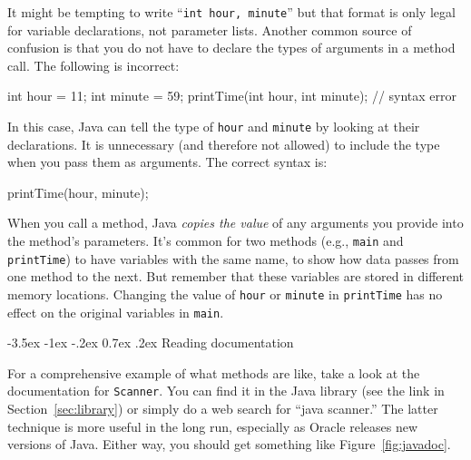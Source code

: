 \documentclass[12pt]{book}
\makeatletter
\renewcommand{\section}{\@startsection {section}{1}{\z@}%
    {-3.5ex \@plus -1ex \@minus -.2ex}%
    {0.7ex \@plus.2ex}%
    {\normalfont\Large\bfseries}}
\theoremstyle{exercise}
\newcommand{\java}[1]{\lstinline{#1}} %
\makeatother
\begin{document}
It might be tempting to write ``\java{int hour, minute}'' but that format is only legal for variable declarations, not parameter lists.
Another common source of confusion is that you do not have to declare the types of arguments in a method call.
The following is incorrect:

\begin{code}
    int hour = 11;
    int minute = 59;
    printTime(int hour, int minute);  // syntax error
\end{code}

In this case, Java can tell the type of \java{hour} and \java{minute} by looking at their declarations.
It is unnecessary (and therefore not allowed) to include the type when you pass them as arguments.
The correct syntax is:

\begin{code}
    printTime(hour, minute);
\end{code}

When you call a method, Java {\it copies the value} of any arguments you provide into the method's parameters.
It's common for two methods (e.g., \java{main} and \java{printTime}) to have variables with the same name, to show how data passes from one method to the next.
But remember that these variables are stored in different memory locations.
Changing the value of \java{hour} or \java{minute} in \java{printTime} has no effect on the original variables in \java{main}.


\section{Reading documentation}
\label{sec:apidocs}


For a comprehensive example of what methods are like, take a look at the documentation for \java{Scanner}.
You can find it in the Java library (see the link in Section~\ref{sec:library}) or simply do a web search for ``java scanner.''
The latter technique is more useful in the long run, especially as Oracle releases new versions of Java.
Either way, you should get something like Figure~\ref{fig:javadoc}.
\end{document}
